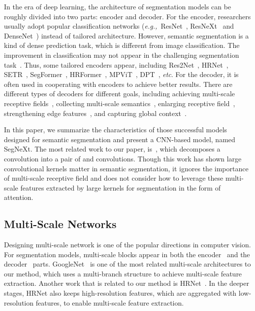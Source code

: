 \documentclass{article}
\def\eg{\emph{e.g.,~}}
\def\etc{{\em etc}}
\begin{document}
In the era of deep learning, the architecture of segmentation models
can be roughly divided into two parts: encoder and decoder. 
For the encoder, researchers usually adopt popular classification networks
(\eg{ResNet~\cite{he2016deep}, ResNeXt~\cite{xie2017aggregated} 
and DenseNet~\cite{huang2017densely}}) instead of tailored architecture.
However, semantic segmentation is a kind of dense prediction task, 
which is different from image classification.
The improvement in classification may not appear in the challenging segmentation task~\cite{he2019bag}.
Thus, some tailored encoders appear, including 
Res2Net~\cite{pami21Res2net},
HRNet~\cite{wang2020deep}, SETR~\cite{zheng2021rethinking}, 
SegFormer~\cite{xie2021segformer}, HRFormer~\cite{yuan2021hrformer}, MPViT~\cite{lee2022mpvit}, DPT~\cite{ranftl2021vision}, \etc.
For the decoder, it is often used in cooperating with 
encoders to achieve better results.
There are different types of decoders for different goals,
including achieving multi-scale receptive fields~\cite{zhao2017pyramid,chen2016attention,xia2016zoom}, 
collecting multi-scale semantics~\cite{ronneberger2015u,xie2021segformer,chen2018encoder},
enlarging receptive field~\cite{chen2017deeplab,chen2014semantic,peng2017large}, 
strengthening edge features~\cite{zhen2020joint,bertasius2016semantic,ding2019boundary,li2020improving,yuan2020segfix}, and capturing global context~\cite{fu2019dual,huang2019ccnet,yuan2018ocnet,li2019expectation,guo2021beyond,he2019adaptive,zhang2018context}.


{In this paper, we summarize the characteristics of those successful models 
designed for semantic segmentation and present a CNN-based model, named SegNeXt.}
The most related work to our paper, is~\cite{peng2017large},
which decomposes a  convolution into a pair of  and 
 convolutions.
Though this work has shown large convolutional kernels matter in semantic segmentation, it ignores the importance of multi-scale receptive field
and does not consider how to leverage these multi-scale features extracted by large
kernels for segmentation in the form of attention.





\subsection{Multi-Scale Networks}

Designing multi-scale network is one of the popular directions in computer vision.
For segmentation models, multi-scale blocks appear in both the 
encoder~\cite{wang2020deep,pami21Res2net,szegedy2015going} and the 
decoder~\cite{zhao2017pyramid,yu2015multi,chen2017rethinking} parts.
GoogleNet~\cite{szegedy2015going} is one of the most related
multi-scale architectures to our method, which uses a multi-branch structure to
achieve multi-scale feature extraction.
Another work that is related to our method is HRNet~\cite{wang2020deep}.
In the deeper stages, HRNet also keeps high-resolution features, which are
aggregated with low-resolution features, to enable multi-scale feature extraction.
\end{document}
